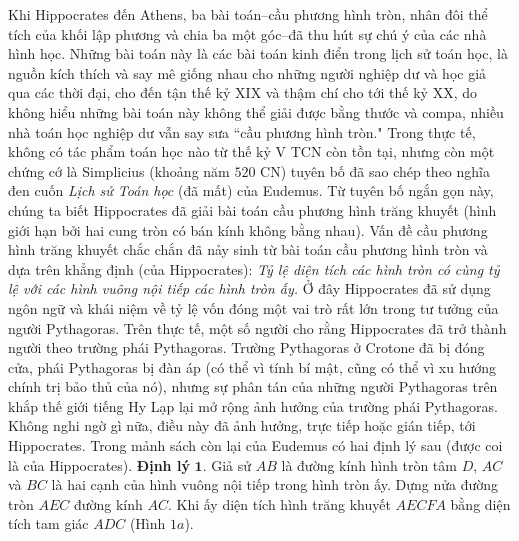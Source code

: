 \begin{multicols}{2}
	\vskip 0.05cm
	Khi Hippocrates đến Athens, ba bài toán--cầu phương hình tròn, nhân đôi thể tích của khối lập phương và chia ba một góc--đã thu hút sự chú ý của các nhà hình học. Những bài toán này là các bài toán kinh điển trong lịch sử toán học, là  nguồn kích thích và say mê giống nhau cho những người nghiệp dư và học giả qua các thời đại, cho đến tận thế kỷ XIX và thậm chí cho tới thế kỷ XX, do không hiểu những bài toán này không thể giải được bằng thước và compa, nhiều nhà toán học nghiệp dư vẫn say sưa ``cầu phương hình tròn."
	\vskip 0.05cm
	Trong thực tế, không có tác phẩm toán học nào từ thế kỷ V TCN còn tồn tại, nhưng còn một chứng cớ là Simplicius (khoảng năm $520$ CN) tuyên bố đã sao chép theo nghĩa đen cuốn  \textit{Lịch sử Toán học} (đã mất) của Eudemus. Từ tuyên bố ngắn gọn này, chúng ta biết Hippocrates đã giải bài toán cầu phương hình trăng khuyết (hình giới hạn bởi hai cung tròn có bán kính không bằng nhau). Vấn đề cầu phương hình trăng khuyết chắc chắn đã nảy sinh từ bài toán cầu phương hình tròn và dựa trên khẳng định (của Hippocrates): \textit{Tỷ lệ diện tích các hình tròn có cùng tỷ lệ với các hình vuông nội tiếp các hình tròn ấy.}
	\vskip 0.05cm
	Ở đây Hippocrates đã sử dụng ngôn ngữ và khái niệm về tỷ lệ vốn đóng một vai trò rất lớn trong tư tưởng của người Pythagoras. Trên thực tế, một số người cho rằng Hippocrates đã trở thành người theo trường phái Pythagoras. Trường Pythagoras ở Crotone đã bị đóng cửa, phái Pythagoras bị đàn áp (có thể vì tính bí mật, cũng có thể vì xu hướng chính trị bảo thủ của nó), nhưng sự phân tán của những người Pythagoras trên khắp thế giới tiếng Hy Lạp lại mở rộng ảnh hưởng của trường phái Pythagoras. Không nghi ngờ gì nữa, điều này đã ảnh hưởng, trực tiếp hoặc gián tiếp, tới Hippocrates.
	\vskip 0.05cm
	Trong mảnh sách còn lại của Eudemus có hai định lý sau (được coi là của Hippocrates). 
	\vskip 0.05cm
	\textbf{\color{lichsutoanhoc}Định lý} $\pmb{1.}$ Giả sử $AB$  là đường kính hình tròn tâm  $D$, $AC$  và $BC$  là hai cạnh của  hình vuông nội tiếp trong hình tròn ấy. Dựng nửa đường tròn $AEC$  đường kính  $AC$. Khi ấy diện tích hình trăng khuyết $AECFA$  bằng diện tích tam giác  $ADC$ (Hình $1a$).
	\begin{figure}[H]
		\centering
		\captionsetup{labelformat= empty, justification=centering}
\end{figure}
\end{multicols}

